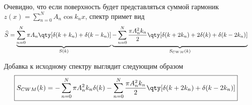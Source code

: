 \documentclass[a4paper,14pt]{extarticle}
\begin{document}
Очевидно, что если поверхность будет представляться суммой гармоник
$z(x) = \sum\limits_{n=0}^{N} A_n \cos{k_n x}$,
спектр примет вид
\begin{equation}
    \label{eq:}
    \widehat S = 
    \underbrace{
    \sum\limits_{n=0}^{N} \pi A_n \qty[\delta(k+k_n) + \delta(k-k_n) ]
}_{S(k)}
\underbrace{
- \sum\limits_{n=0}^{N} \frac{\pi A_{n}^2 k_n}{2}
\qty[ \delta(k+2k_{n}) 
    + 2\delta(k) 
+ \delta(k-2k_{n})]
}_{S_{CWM}(k)}
\end{equation}

Добавка к исходному спектру выглядит следующим образом
\begin{gather}
    \label{eq:}
    \boxed{
    S_{CWM}(k) = - \sum\limits_{n=0}^{N} \pi A_{n}^2 k_n \delta(k) - 
    \sum\limits_{n=0}^{N} \frac{\pi A_n^2 k_n}{2} \qty[\delta(k+2k_n) +
    \delta(k-2k_n)]
}
\end{gather}
\end{document}
